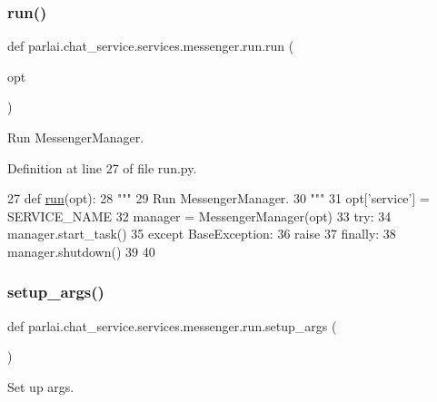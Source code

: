 \subsubsection{\texorpdfstring{run()}{run()}}
{\footnotesize\ttfamily def parlai.\+chat\+\_\+service.\+services.\+messenger.\+run.\+run (\begin{DoxyParamCaption}\item[{}]{opt }\end{DoxyParamCaption})}

\begin{DoxyVerb}Run MessengerManager.
\end{DoxyVerb}
 

Definition at line 27 of file run.\+py.


\begin{DoxyCode}
27 \textcolor{keyword}{def }\hyperlink{namespaceparlai_1_1tasks_1_1talkthewalk_1_1run_a0a1ec08b8196cb008e4df83468c67e5b}{run}(opt):
28     \textcolor{stringliteral}{"""}
29 \textcolor{stringliteral}{    Run MessengerManager.}
30 \textcolor{stringliteral}{    """}
31     opt[\textcolor{stringliteral}{'service'}] = SERVICE\_NAME
32     manager = MessengerManager(opt)
33     \textcolor{keywordflow}{try}:
34         manager.start\_task()
35     \textcolor{keywordflow}{except} BaseException:
36         \textcolor{keywordflow}{raise}
37     \textcolor{keywordflow}{finally}:
38         manager.shutdown()
39 
40 
\end{DoxyCode}
\mbox{\label{namespaceparlai_1_1chat__service_1_1services_1_1messenger_1_1run_a17bafea2534d593de1fbf1e0724e5b67}} 
\subsubsection{\texorpdfstring{setup\+\_\+args()}{setup\_args()}}
{\footnotesize\ttfamily def parlai.\+chat\+\_\+service.\+services.\+messenger.\+run.\+setup\+\_\+args (\begin{DoxyParamCaption}{ }\end{DoxyParamCaption})}

\begin{DoxyVerb}Set up args.
\end{DoxyVerb}
 

